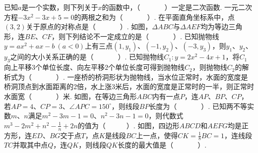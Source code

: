 \documentclass[10pt]{article}
\begin{document}
\showsecret
{}
\paperinformation
\begin{questions}{\selectingintroduction}
    \question 已知$a$是一个实数，则下列关于$x$的函数中，（~~~~~~~）一定是二次函数.
    \question 一元二次方程$-3x^2-3x+5=0$的两根之和为（~~~~~~~）.
    \question 在平面直角坐标系中，点$(3,2)$关于原点的对称点是（~~~~~~~）.
    \question 如图，$\Delta ABC$与$\Delta AEF$均为等边三角形，连$BE$、$CF$，则下列结论不一定成立的是（~~~~~~~）.
    \question 已知抛物线$y=ax^2+ax-b \ (a < 0)$上有三点$(1,y_1)$、$(-1,y_2)$、$(-3,y_3)$，则$y_1$、$y_2$、$y_3$之间的大小关系正确的是（~~~~~~~）.
    \question 已知抛物线$C_1:y=2x^2-4x+1$，将$C_1$向上平移$3$个单位长度、向左平移$2$个单位长度可得到抛物线$C_2$，则抛物线$C_2$的解析式为（~~~~~~~）.
    \question 一座桥的桥洞形状为抛物线，当水位正常时，水面的宽度是桥洞顶点到水面距离的2倍，水上涨3米后，水面的宽度是正常时的一半，则正常时水面宽（~~~~~~~）米.
    \question 如图，在等边三角形$ABC$内有一点$P$，连$AP$、$BP$、$CP$，若$AP=4$、$CP=3$、$\angle APC=150^{\circ}$，则线段$BP$长度为（~~~~~~~）.
    \question 已知两不等实数$m$、$n$满足$m^2-3m-1=0$、$n^2-3n-1=0$，则代数式$m^3-2m^2+n^2-\frac{1}{n}+2n$的值为（~~~~~~）.
    \question 如图，四边形$ABCD$和$AEFG$均是正方形，连$ED$、$BG$交于点$T$，点$K$是线段$BC$上一点，使得$CK=\frac{1}{8}BC=1$，连线段$TC$并取其中点$Q$，连$QK$，则线段$QK$长度的最大值是（~~~~~~~）.
    \begin{figure}[!htb]
        \centering
\end{figure}
\end{questions}
\end{document}
